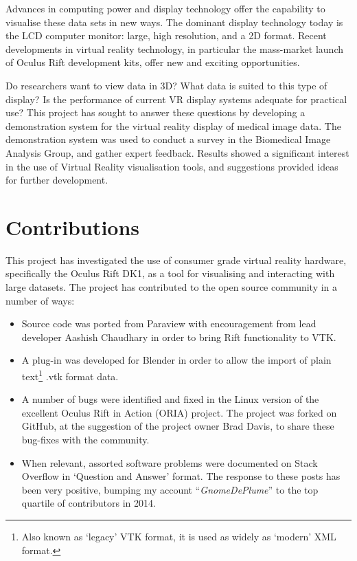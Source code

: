 \documentclass[MSc,paper=a4,pagesize=auto]{icldt}
\begin{document}
Advances in computing power and display technology offer the capability to visualise these data sets in new ways. The dominant display technology today is the LCD computer monitor: large, high resolution, and a 2D format. Recent developments in virtual reality technology, in particular the mass-market launch of Oculus Rift development kits, offer new and exciting opportunities.

Do researchers want to view data in 3D? What data is suited to this type of display? Is the performance of current VR display systems adequate for practical use? This project has sought to answer these questions by developing a demonstration system for the virtual reality display of medical image data. The demonstration system was used to conduct a survey in the Biomedical Image Analysis Group, and gather expert feedback. Results showed a significant interest in the use of Virtual Reality visualisation tools, and suggestions provided ideas for further development.

\newpage
\section{Contributions}
This project has investigated the use of consumer grade virtual reality hardware, specifically the Oculus Rift DK1, as a tool for visualising and interacting with large datasets. The project has contributed to the open source community in a number of ways:

\begin{itemize}
  \item Source code was ported from Paraview with encouragement from lead developer Aashish Chaudhary in order to bring Rift functionality to VTK.
  \item A plug-in was developed for Blender in order to allow the import of plain text\footnote{Also known as `legacy' VTK format, it is used as widely as `modern' XML format.} .vtk format data.
  \item A number of bugs were identified and fixed in the Linux version of the excellent Oculus Rift in Action (ORIA) project. The project was forked on GitHub, at the suggestion of the project owner Brad Davis, to share these bug-fixes with the community.
  \item When relevant, assorted software problems were documented on Stack Overflow in `Question and Answer' format. The response to these posts has been very positive, bumping my account ``\textit{GnomeDePlume}'' to the top quartile of contributors in 2014.  
\end{itemize}
\end{document}
